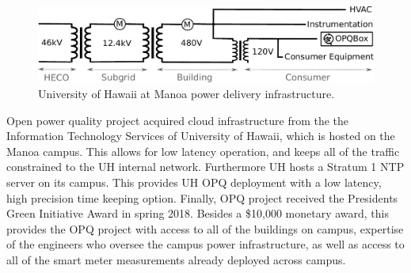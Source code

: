 \begin{figure}[h]
	\centering
	\includegraphics[width=1\linewidth]{img/uh-grid.pdf}	
	\caption{University of Hawaii at Manoa power delivery infrastructure.}
	\label{expdes:fig:1}
\end{figure}
Open power quality project acquired cloud infrastructure from the the Information Technology Services of University of Hawaii, which is hosted on the Manoa campus. This allows for low latency operation, and keeps all of the traffic constrained to the UH internal network. Furthermore UH hosts a Stratum 1 NTP server on its campus. This provides UH OPQ deployment with a low latency, high precision time keeping option. Finally, OPQ project received the Presidents Green Initiative Award in spring 2018. Besides a \$10,000 monetary award, this provides the OPQ project with access to all of the buildings on campus, expertise of the engineers who oversee the campus power infrastructure, as well as access to all of the smart meter measurements already deployed across campus. 

